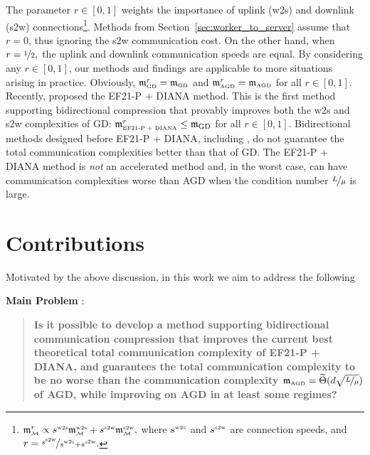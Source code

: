 \documentclass{article} %
\newcommand{\cM}{\mathcal{M}}
\theoremstyle{plain}
\theoremstyle{definition}
\theoremstyle{remark}
\newcommand{\green}{\color{mydarkgreen}}
\newcommand{\algname}[1]{{\small\green\sf #1}}
\begin{document}
The parameter $r \in [0, 1]$ weights the importance of uplink (w2s) and downlink (s2w) connections\footnote{$\mathfrak{m}^{r}_{{\scriptscriptstyle \cM}} \propto s^{{\scriptscriptstyle \textnormal{w2s}}} \mathfrak{m}^{{\scriptscriptstyle \textnormal{w2s}}}_{{\scriptscriptstyle \cM}} + s^{{\scriptscriptstyle \textnormal{s2w}}} \mathfrak{m}^{{\scriptscriptstyle \textnormal{s2w}}}_{{\scriptscriptstyle \cM}},$ where $s^{{\scriptscriptstyle \textnormal{w2s}}}$ and $s^{{\scriptscriptstyle \textnormal{s2w}}}$ are connection speeds, and $r = \nicefrac{s^{{\scriptscriptstyle \textnormal{s2w}}}}{s^{{\scriptscriptstyle \textnormal{w2s}}} + s^{{\scriptscriptstyle \textnormal{s2w}}}}.$}. 
Methods from Section~\ref{sec:worker_to_server} assume that $r=0$, thus ignoring the s2w communication cost. On the other hand, when $r = \nicefrac{1}{2},$ the uplink and downlink communication speeds are equal. By considering any $r\in [0,1]$, our methods and findings are applicable to more situations arising in practice. 
Obviously, $\mathfrak{m}^{r}_{{\scriptscriptstyle \textnormal{GD}}} = \mathfrak{m}_{{\scriptscriptstyle \textnormal{GD}}}$ and $\mathfrak{m}^{r}_{{\scriptscriptstyle \textnormal{AGD}}} = \mathfrak{m}_{{\scriptscriptstyle \textnormal{AGD}}}$ for all $r \in [0, 1].$ Recently, \citet{gruntkowska2022ef21} proposed the \algname{EF21-P + DIANA} method. This is the first  method supporting bidirectional compression that provably improves both the w2s and s2w complexities of \algname{GD}: $\mathfrak{m}^{r}_{{\scriptscriptstyle \textnormal{EF21-P + DIANA}}} \leq \mathfrak{m}_{\textnormal{GD}}$ for all $r \in [0, 1].$ Bidirectional methods designed before \algname{EF21-P + DIANA}, including \citep{DoubleSqueeze, liu2020double, philippenko2021preserved}, do not guarantee the total communication complexities better than that of \algname{GD}. The \algname{EF21-P + DIANA} method is {\em not} an accelerated method and, in the worst case, can have communication complexities worse than \algname{AGD} when the condition number $\nicefrac{L}{\mu}$ is large.

\section{Contributions}

Motivated by the above discussion, in this work we aim to address the following 
\makeatletter
\newcommand{\setword}[2]{%
  \phantomsection
  #1\def\@currentlabel{\unexpanded{#1}}\label{#2}%
}
\makeatother

{\bf \setword{Main Problem}{word:problem}}: 
\begin{quote}\bf Is it possible to develop a method supporting bidirectional communication compression that  improves the current best theoretical total communication complexity of \algname{EF21-P + DIANA}, and guarantees the total communication complexity to be no worse than the communication complexity 
$\mathfrak{m}_{{\scriptscriptstyle \textnormal{AGD}}} = \widetilde{\Theta}(d \sqrt{\nicefrac{L}{\mu}})$ of \algname{AGD}, while improving on \algname{AGD} in at least some regimes?
\end{quote}
\end{document}
